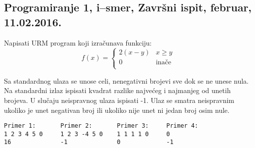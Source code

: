 \subsection{Programiranje 1, i--smer, Zavr\v{s}ni ispit, februar, 11.02.2016.}

\begin{Exercise}[label=v1.3_01] 
Napisati URM program koji izra\v cunava funkciju:
    $$ f(x)= \begin{cases}
                  2(x - y) & x \geq y \\
                  0 & \text{ina\v ce} \\
                  \end{cases}  $$
\end{Exercise}
\begin{Answer}[ref=v1.3_01]
\end{Answer}


\begin{Exercise}[label=v1.3_01] 
Sa standardnog ulaza se unose celi, nenegativni brojevi sve dok se ne
unese nula. Na standardni izlaz ispisati kvadrat razlike najvećeg i
najmanjeg od unetih brojeva. U slučaju neispravnog ulaza ispisati
-1. Ulaz se smatra neispravnim ukoliko je unet negativan broj ili
ukoliko nije unet ni jedan broj osim nule.


\begin{center}
\begin{verbatim}
Primer 1:       Primer 2:       Primer 3:     Primer 4:  
1 2 3 4 5 0     1 2 3 -4 5 0    1 1 1 1 0     0
16              -1              0             -1
\end{verbatim}
\end{center}
\end{Exercise}
\begin{Answer}[ref=v1.3_01]
\end{Answer}


